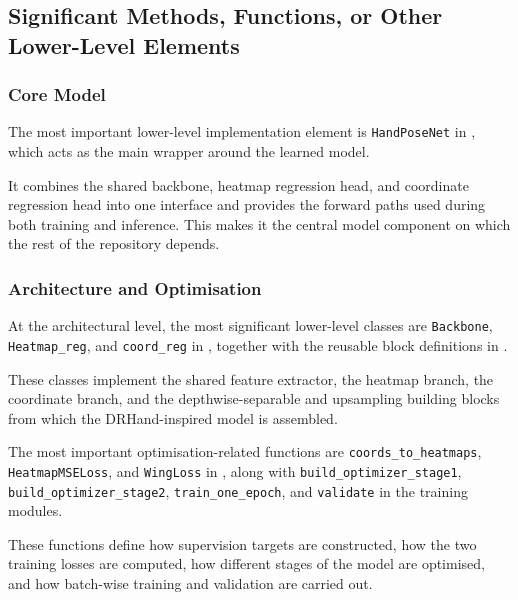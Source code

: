 ﻿\documentclass[11pt,a4paper]{article}
\begin{document}
\subsection{Significant Methods, Functions, or Other Lower-Level Elements}

\subsubsection*{Core Model}

The most important lower-level implementation element is \texttt{HandPoseNet}
in , which acts as the main
wrapper around the learned model.

\medskip

It combines the shared backbone, heatmap regression head, and coordinate
regression head into one interface and provides the forward paths used during
both training and inference. This makes it the central model component on
which the rest of the repository depends.

\subsubsection*{Architecture and Optimisation}

At the architectural level, the most significant lower-level classes are
\texttt{Backbone}, \texttt{Heatmap\_reg}, and \texttt{coord\_reg} in
, together with the reusable block
definitions in .

\medskip

These classes implement the shared feature extractor, the heatmap branch, the
coordinate branch, and the depthwise-separable and upsampling building blocks
from which the DRHand-inspired model is assembled.

\medskip

The most important optimisation-related functions are
\texttt{coords\_to\_heatmaps}, \texttt{HeatmapMSELoss}, and \texttt{WingLoss}
in , along with
\texttt{build\_optimizer\_stage1}, \texttt{build\_optimizer\_stage2},
\texttt{train\_one\_epoch}, and \texttt{validate} in the training modules.

These functions define how supervision targets are constructed, how the two
training losses are computed, how different stages of the model are optimised,
and how batch-wise training and validation are carried out.
\end{document}
